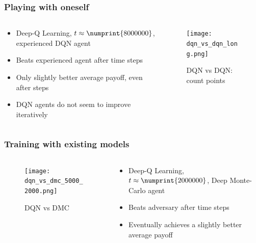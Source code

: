 
\begin{frame}
\frametitle{Playing with oneself}
\begin{columns}[c]

\begin{column}{.5\textwidth}
\begin{itemize}
\item Deep-Q Learning, $t \approx \numprint{8000000}$, experienced DQN agent
\item Beats experienced agent after  time steps
\item Only slightly better average payoff, even after  steps
\item DQN agents do not seem to improve iteratively
\end{itemize}
\end{column}

\begin{column}{.5\textwidth}
\begin{figure}
\texttt{[image: dqn\_vs\_dqn\_long.png]}
\caption{DQN vs DQN: count points}
\end{figure}
\end{column}

\end{columns}
\end{frame}


\begin{frame}
\frametitle{Training with existing models}
\begin{columns}[c]

\begin{column}{.5\textwidth}
\begin{figure}
\texttt{[image: dqn\_vs\_dmc\_5000\_2000.png]}
\caption{DQN vs DMC}
\end{figure}
\end{column}

\begin{column}{.5\textwidth}
\begin{itemize}
\item Deep-Q Learning, $t \approx \numprint{2000000}$, Deep Monte-Carlo agent
\item Beats adversary after  time steps
\item Eventually achieves a slightly better average payoff
\end{itemize}
\end{column}

\end{columns}
\end{frame}
